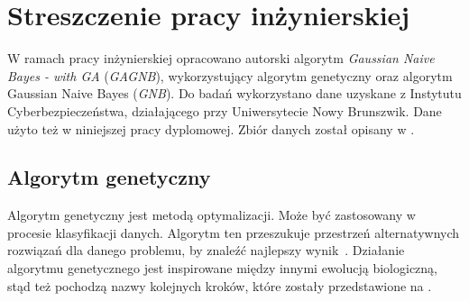 \chapter{Streszczenie pracy inżynierskiej}
W ramach pracy inżynierskiej opracowano autorski algorytm \textit{Gaussian Naive Bayes - with GA} (\textit{GAGNB}), wykorzystujący algorytm genetyczny oraz algorytm Gaussian Naive Bayes (\textit{GNB}). Do badań wykorzystano dane uzyskane z Instytutu Cyberbezpieczeństwa, działającego przy Uniwersytecie Nowy Brunszwik. Dane użyto też w niniejszej pracy dyplomowej. Zbiór danych został opisany w .

\section{Algorytm genetyczny}
Algorytm genetyczny jest metodą optymalizacji. Może być zastosowany w procesie klasyfikacji danych. Algorytm ten przeszukuje przestrzeń alternatywnych rozwiązań dla danego problemu, by znaleźć najlepszy
wynik~\cite{Kusiak2021}. Działanie algorytmu genetycznego jest inspirowane między innymi ewolucją biologiczną, stąd też pochodzą nazwy kolejnych kroków, które zostały przedstawione na .



